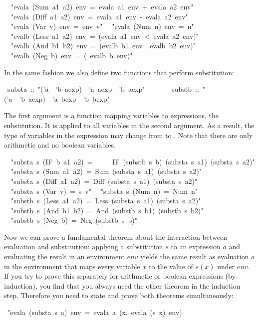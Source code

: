 \begin{isabelle}
~~{"}evala~(Sum~a1~a2)~env~=~evala~a1~env~+~evala~a2~env{"}\isanewline
~~{"}evala~(Diff~a1~a2)~env~=~evala~a1~env~-~evala~a2~env{"}\isanewline
~~{"}evala~(Var~v)~env~=~env~v{"}\isanewline
~~{"}evala~(Num~n)~env~=~n{"}\isanewline
\isanewline
~~{"}evalb~(Less~a1~a2)~env~=~(evala~a1~env~<~evala~a2~env){"}\isanewline
~~{"}evalb~(And~b1~b2)~env~=~(evalb~b1~env~{\isasymand}~evalb~b2~env){"}\isanewline
~~{"}evalb~(Neg~b)~env~=~({\isasymnot}~evalb~b~env){"}%
\begin{isamarkuptext}%
\noindent
In the same fashion we also define two functions that perform substitution:%
\end{isamarkuptext}%
~substa~::~{"}('a~{\isasymRightarrow}~'b~aexp)~{\isasymRightarrow}~'a~aexp~{\isasymRightarrow}~'b~aexp{"}\isanewline
~~~~~~~substb~::~{"}('a~{\isasymRightarrow}~'b~aexp)~{\isasymRightarrow}~'a~bexp~{\isasymRightarrow}~'b~bexp{"}%
\begin{isamarkuptext}%
\noindent
The first argument is a function mapping variables to expressions, the
substitution. It is applied to all variables in the second argument. As a
result, the type of variables in the expression may change from 
to . Note that there are only arithmetic and no boolean variables.%
\end{isamarkuptext}%
\isanewline
~~{"}substa~s~(IF~b~a1~a2)~=\isanewline
~~~~~IF~(substb~s~b)~(substa~s~a1)~(substa~s~a2){"}\isanewline
~~{"}substa~s~(Sum~a1~a2)~=~Sum~(substa~s~a1)~(substa~s~a2){"}\isanewline
~~{"}substa~s~(Diff~a1~a2)~=~Diff~(substa~s~a1)~(substa~s~a2){"}\isanewline
~~{"}substa~s~(Var~v)~=~s~v{"}\isanewline
~~{"}substa~s~(Num~n)~=~Num~n{"}\isanewline
\isanewline
~~{"}substb~s~(Less~a1~a2)~=~Less~(substa~s~a1)~(substa~s~a2){"}\isanewline
~~{"}substb~s~(And~b1~b2)~=~And~(substb~s~b1)~(substb~s~b2){"}\isanewline
~~{"}substb~s~(Neg~b)~=~Neg~(substb~s~b){"}%
\begin{isamarkuptext}%
Now we can prove a fundamental theorem about the interaction between
evaluation and substitution: applying a substitution $s$ to an expression $a$
and evaluating the result in an environment $env$ yields the same result as
evaluation $a$ in the environment that maps every variable $x$ to the value
of $s(x)$ under $env$. If you try to prove this separately for arithmetic or
boolean expressions (by induction), you find that you always need the other
theorem in the induction step. Therefore you need to state and prove both
theorems simultaneously:%
\end{isamarkuptext}%
~{"}evala~(substa~s~a)~env~=~evala~a~({\isasymlambda}x.~evala~(s~x)~env)~{\isasymand}\isanewline

\end{isabelle}
